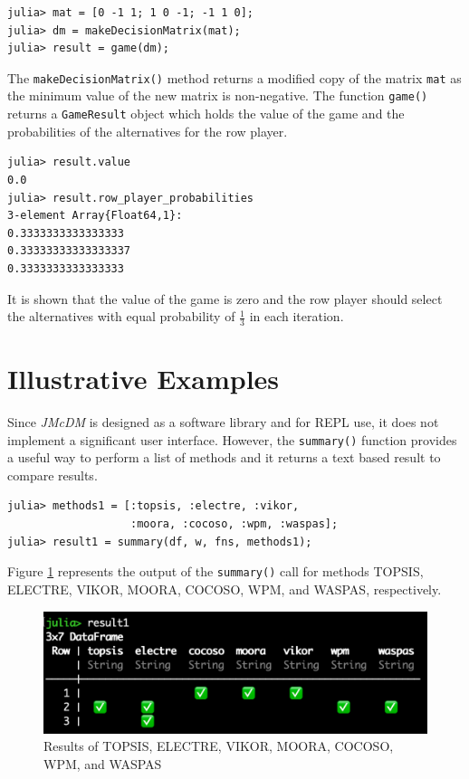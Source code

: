 \documentclass[preprint,review, 12pt, a4paper]{elsarticle}
\begin{document}
\begin{verbatim}
julia> mat = [0 -1 1; 1 0 -1; -1 1 0];
julia> dm = makeDecisionMatrix(mat);
julia> result = game(dm);
\end{verbatim}

\noindent The \texttt{makeDecisionMatrix()} method returns a modified copy of the matrix \texttt{mat} as the minimum value of the new matrix is non-negative. The function \texttt{game()} returns 
a \texttt{GameResult} object which holds the value of the game and the probabilities of the alternatives for the row player.

\begin{verbatim}
julia> result.value
0.0
julia> result.row_player_probabilities
3-element Array{Float64,1}:
0.3333333333333333
0.33333333333333337
0.3333333333333333
\end{verbatim}

\noindent It is shown that the value of the game is zero and the row player should select the alternatives with equal probability of  $\frac{1}{3}$ in each iteration.



\section{Illustrative Examples}
\label{sec:Illustrative_examples}

Since \emph{JMcDM} is designed as a software library and for REPL use, it does not implement
a significant user interface. However, the \texttt{summary()} function provides a useful way
to perform a list of methods and it returns a text based result to compare results. 

\begin{verbatim}
julia> methods1 = [:topsis, :electre, :vikor, 
                   :moora, :cocoso, :wpm, :waspas];
julia> result1 = summary(df, w, fns, methods1);
\end{verbatim}

Figure \ref{fig:imagea} represents the output of the \texttt{summary()} call for methods TOPSIS, ELECTRE, VIKOR, MOORA, COCOSO, WPM,  and WASPAS, respectively.

\begin{figure}
	\includegraphics[width=\columnwidth]{images/result1}
	\caption{Results of TOPSIS, ELECTRE, VIKOR, MOORA, COCOSO, WPM, and WASPAS}
	\label{fig:imagea}
	\end{figure}
\end{document}
